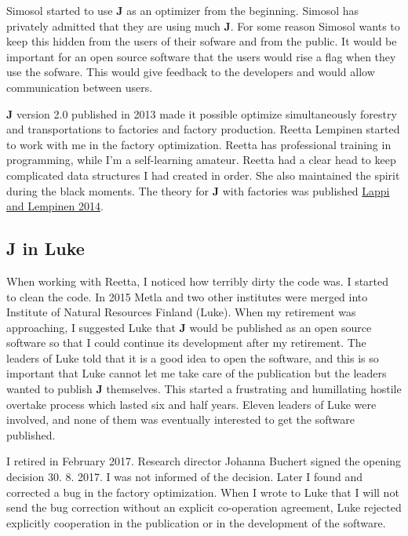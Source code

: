 Simosol started to use \textbf{J} as an 
optimizer from the beginning. Simosol has privately admitted 
that they are using much \textbf{J}. 
For some reason Simosol 
wants to keep this hidden from the users of their sofware and from the public. 
It would be important for an open source software that 
the users would rise a flag when they use the sofware. 
This would give feedback to the developers 
and would allow communication between users. 
 
\textbf{J} version 2.0 published in 2013 made it possible optimize simultaneously 
forestry and transportations to factories 
and factory production. 
Reetta Lempinen started to work with me in the factory optimization. 
Reetta has professional 
training in programming, while I'm a self-learning amateur. 
Reetta had a clear head to keep complicated data structures I had created in order. 
She also maintained the spirit during the black moments. The theory for \textbf{J} with factories was published 
\href{run:./lappilempinen.pdf}{Lappi and Lempinen 2014}. 
 
 
\subsection*{\textbf{J} in Luke} 
When working with Reetta, I noticed how terribly dirty the code was. I started to clean the 
code. 
In 2015 Metla and 
two other institutes were merged into Institute of Natural Resources Finland (Luke). 
When my retirement was approaching, I suggested Luke that \textbf{J} would be published as 
an open source software so that I could continue its development after my retirement. 
The leaders of Luke told that it is a good idea to open the software, and this is so important that 
Luke cannot let me take care of the publication but the leaders wanted to publish \textbf{J} 
themselves. This started a frustrating and humillating hostile overtake process which lasted six 
and half years. Eleven 
leaders of Luke were involved, 
and none of them was eventually interested to get the software published. 
 
I retired in February 2017.  Research director Johanna Buchert signed the opening decision 30. 8. 2017. 
I was not informed of the decision. Later I found and corrected a bug in the factory 
optimization. When I wrote to Luke that I will not send the bug correction without an explicit 
co-operation agreement, Luke rejected explicitly cooperation 
in the publication or in the development of 
the software. 
 
